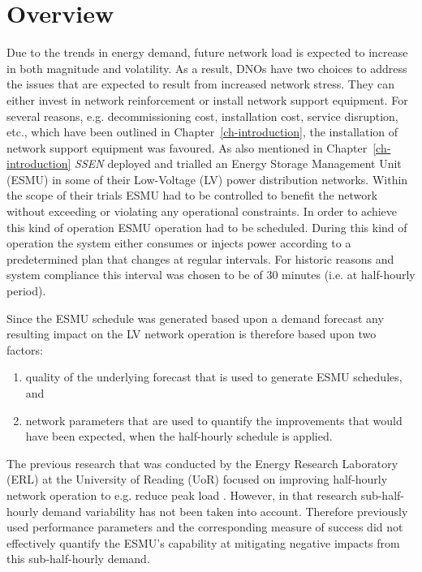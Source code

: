 \section{Overview}
\label{ch1:sec:overview}

Due to the trends in energy demand, future network load is expected to increase in both magnitude and volatility.
As a result, DNOs have two choices to address the issues that are expected to result from increased network stress.
They can either invest in network reinforcement or install network support equipment.
For several reasons, e.g. decommissioning cost, installation cost, service disruption, etc., which have been outlined in Chapter~\ref{ch-introduction}, the installation of network support equipment was favoured.
As also mentioned in Chapter~\ref{ch-introduction} \textit{SSEN} deployed and trialled an Energy Storage Management Unit (ESMU) in some of their Low-Voltage (LV) power distribution networks.
Within the scope of their trials ESMU had to be controlled to benefit the network without exceeding or violating any operational constraints.
In order to achieve this kind of operation ESMU operation had to be scheduled.
During this kind of operation the system either consumes or injects power according to a predetermined plan that changes at regular intervals.
For historic reasons and system compliance this interval was chosen to be of 30 minutes (i.e. at half-hourly period).

Since the ESMU schedule was generated based upon a demand forecast any resulting impact on the LV network operation is therefore based upon two factors:

\begin{enumerate}
	\item quality of the underlying forecast that is used to generate ESMU schedules, and
	\item network parameters that are used to quantify the improvements that would have been expected, when the half-hourly schedule is applied.
\end{enumerate}


The previous research that was conducted by the Energy Research Laboratory (ERL) at the University of Reading (UoR) focused on improving half-hourly network operation to e.g. reduce peak load \cite{Rowe2014a, Yunusov2011}.
However, in that research sub-half-hourly demand variability has not been taken into account.
Therefore previously used performance parameters and the corresponding measure of success did not effectively quantify the ESMU's capability at mitigating negative impacts from this sub-half-hourly demand.

